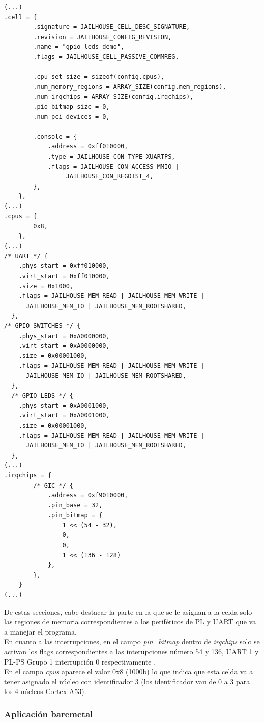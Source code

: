 \begin{lstlisting}[style=CStyle]
(...)
.cell = {
		.signature = JAILHOUSE_CELL_DESC_SIGNATURE,
		.revision = JAILHOUSE_CONFIG_REVISION,
		.name = "gpio-leds-demo",
		.flags = JAILHOUSE_CELL_PASSIVE_COMMREG,

		.cpu_set_size = sizeof(config.cpus),
		.num_memory_regions = ARRAY_SIZE(config.mem_regions),
		.num_irqchips = ARRAY_SIZE(config.irqchips),
		.pio_bitmap_size = 0,
		.num_pci_devices = 0,

		.console = {
			.address = 0xff010000,
			.type = JAILHOUSE_CON_TYPE_XUARTPS,
			.flags = JAILHOUSE_CON_ACCESS_MMIO |
				 JAILHOUSE_CON_REGDIST_4,
		},
	},
(...)
.cpus = {
		0x8,
	},
(...)
/* UART */ {
    .phys_start = 0xff010000,
    .virt_start = 0xff010000,
    .size = 0x1000,
    .flags = JAILHOUSE_MEM_READ | JAILHOUSE_MEM_WRITE |
      JAILHOUSE_MEM_IO | JAILHOUSE_MEM_ROOTSHARED,
  },
/* GPIO_SWITCHES */ {
    .phys_start = 0xA0000000,
    .virt_start = 0xA0000000,
    .size = 0x00001000,
    .flags = JAILHOUSE_MEM_READ | JAILHOUSE_MEM_WRITE |
      JAILHOUSE_MEM_IO | JAILHOUSE_MEM_ROOTSHARED,
  },
  /* GPIO_LEDS */ {
    .phys_start = 0xA0001000,
    .virt_start = 0xA0001000,
    .size = 0x00001000,
    .flags = JAILHOUSE_MEM_READ | JAILHOUSE_MEM_WRITE |
      JAILHOUSE_MEM_IO | JAILHOUSE_MEM_ROOTSHARED,
  },
(...)
.irqchips = {
		/* GIC */ {
			.address = 0xf9010000,
			.pin_base = 32,
			.pin_bitmap = {
				1 << (54 - 32),
				0,
				0,
				1 << (136 - 128)
			},
		},
	}
(...)
\end{lstlisting}

De estas secciones, cabe destacar la parte en la que se le asignan a la celda solo las regiones de memoria correspondientes a los periféricos de \acrshort{PL} y \acrshort{UART} que va a manejar el programa.\\
En cuanto a las interrupciones, en el campo \textit{pin\_bitmap} dentro de \textit{irqchips} solo se activan los flags correspondientes a las interupciones número 54 y 136, \acrshort{UART} 1 y \acrshort{PL}-\acrshort{PS} Grupo 1 interrupción 0 respectivamente \cite{mpsoc_registers}.\\
En el campo \textit{cpus} aparece el valor 0x8 (1000b) lo que indica que esta celda va a tener asignado el núcleo con identificador 3 (los identificador van de 0 a 3 para los 4 núcleos Cortex-A53).

\subsubsection{Aplicación baremetal} \label{jailhouse:app_baremetal}

